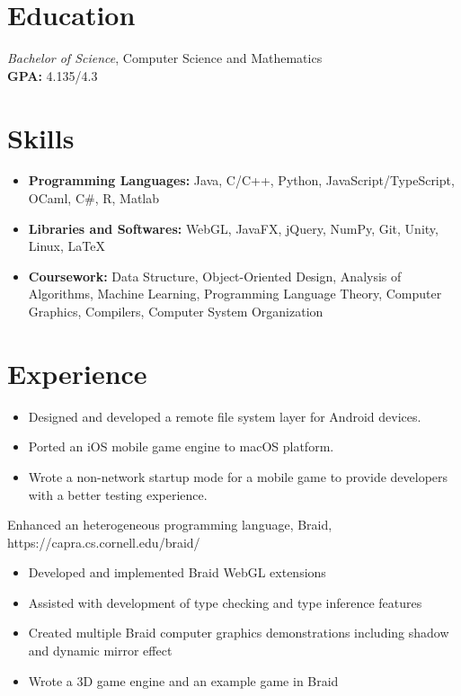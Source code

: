 \documentclass{resume}
\begin{document}



\section{Education}
\textit{Bachelor of Science}, Computer Science and Mathematics\\
\textbf{GPA: }4.135/4.3

\section{Skills}
\begin{itemize}[parsep=0.5ex]
  \item \textbf{Programming Languages:} Java, C/C++, Python, JavaScript/TypeScript, OCaml, C\#, R, Matlab
  \item \textbf{Libraries and Softwares:} WebGL, JavaFX, jQuery, NumPy, Git, Unity, Linux, \LaTeX
  \item \textbf{Coursework: }Data Structure, Object-Oriented Design, Analysis of Algorithms, Machine Learning, Programming Language Theory, Computer Graphics, Compilers, Computer System Organization
\end{itemize}

\section{Experience}
\begin{itemize}
  \item Designed and developed a remote file system layer for Android devices.
  \item Ported an iOS mobile game engine to macOS platform.
  \item Wrote a non-network startup mode for a mobile game to provide developers with a better testing experience.
\end{itemize}

Enhanced an heterogeneous programming language, Braid, https://capra.cs.cornell.edu/braid/
\begin{itemize}
  \item Developed and implemented Braid WebGL extensions
  \item Assisted with development of type checking and type inference features
  \item Created multiple Braid computer graphics demonstrations including shadow and dynamic mirror effect
  \item Wrote a 3D game engine and an example game in Braid
\end{itemize}
\end{document}
